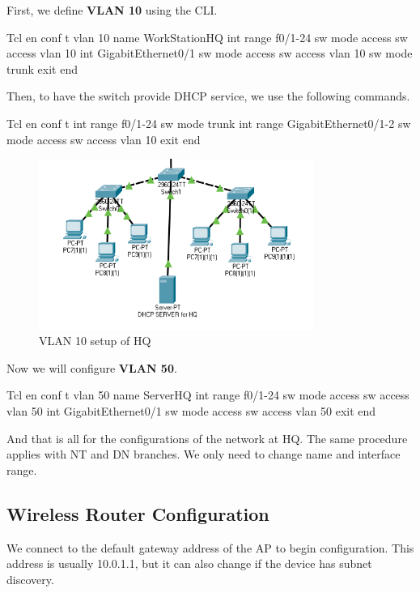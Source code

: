 First, we define \textbf{VLAN 10} using the CLI\@.
\begin{code}{Tcl}
  en
  conf t
  vlan 10
  name WorkStationHQ
  int range f0/1-24
  sw mode access
  sw access vlan 10
  int GigabitEthernet0/1
  sw mode access
  sw access vlan 10
  sw mode trunk
  exit
  end
\end{code}

Then, to have the switch provide DHCP service, we use the following commands.
\begin{code}{Tcl}
  en
  conf t
  int range f0/1-24
  sw mode trunk
  int range GigabitEthernet0/1-2
  sw mode access
  sw access vlan 10
  exit
  end
\end{code}

\begin{figure}[H]
  \centering
  \includegraphics[width=0.8\textwidth]{./assets/pkt2.png}
  \caption{VLAN 10 setup of HQ}
\end{figure}

Now we will configure \textbf{VLAN 50}.
\begin{code}{Tcl}
  en
  conf t
  vlan 50
  name ServerHQ
  int range f0/1-24
  sw mode access
  sw access vlan 50
  int GigabitEthernet0/1
  sw mode access
  sw access vlan 50
  exit
  end
\end{code}

And that is all for the configurations of the network at HQ\@.
The same procedure applies with NT and DN branches.
We only need to change name and interface range.

\subsection{Wireless Router Configuration}
We connect to the default gateway address of the AP to begin configuration.
This address is usually 10.0.1.1, but it can also change if the device has subnet discovery.

